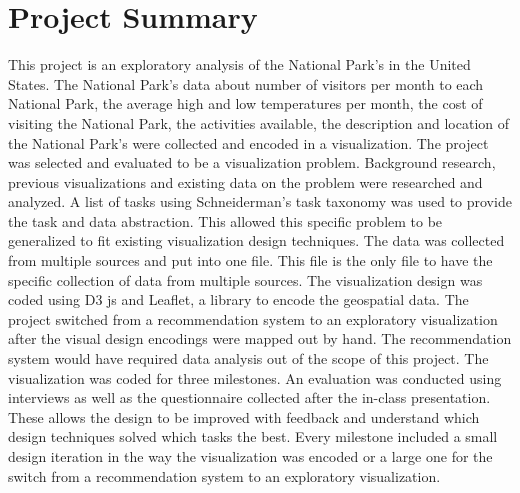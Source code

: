 \section{Project Summary}

This project is an exploratory analysis of the National Park's in the United States. The National Park's data about number of visitors per month to each National Park, the average high and low temperatures per month, the cost of visiting the National Park, the activities available, the description and location of the National Park's were collected and encoded in a visualization. The project was selected and evaluated to be a visualization problem. Background research, previous visualizations and existing data on the problem were researched and analyzed. A list of tasks using Schneiderman's task taxonomy was used to provide the task and data abstraction. This allowed this specific problem to be generalized to fit existing visualization design techniques. The data was collected from multiple sources and put into one file. This file is the only file to have the specific collection of data from multiple sources. The visualization design was coded using D3 js and Leaflet, a library to encode the geospatial data. The project switched from a recommendation system to an exploratory visualization after the visual design encodings were mapped out by hand. The recommendation system would have required data analysis out of the scope of this project. The visualization was coded for three milestones. An evaluation was conducted using interviews as well as the questionnaire collected after the in-class presentation. These allows the design to be improved with feedback and understand which design techniques solved which tasks the best. Every milestone included a small design iteration in the way the visualization was encoded or a large one for the switch from a recommendation system to an exploratory visualization. 
